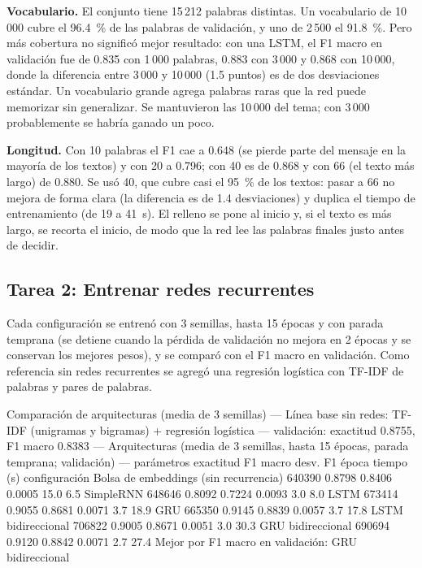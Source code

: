 \documentclass[11pt,letterpaper]{article}
\begin{document}
\textbf{Vocabulario.} El conjunto tiene 15\,212 palabras distintas. Un vocabulario de 10\,000 cubre el 96.4~\% de las palabras de validación, y uno de 2\,500 el 91.8~\%. Pero más cobertura no significó mejor resultado: con una LSTM, el F1 macro en validación fue de 0.835 con 1\,000 palabras, 0.883 con 3\,000 y 0.868 con 10\,000, donde la diferencia entre 3\,000 y 10\,000 (1.5 puntos) es de dos desviaciones estándar. Un vocabulario grande agrega palabras raras que la red puede memorizar sin generalizar. Se mantuvieron las 10\,000 del tema; con 3\,000 probablemente se habría ganado un poco.

\textbf{Longitud.} Con 10 palabras el F1 cae a 0.648 (se pierde parte del mensaje en la mayoría de los textos) y con 20 a 0.796; con 40 es de 0.868 y con 66 (el texto más largo) de 0.880. Se usó 40, que cubre casi el 95~\% de los textos: pasar a 66 no mejora de forma clara (la diferencia es de 1.4 desviaciones) y duplica el tiempo de entrenamiento (de 19 a 41~s). El relleno se pone al inicio y, si el texto es más largo, se recorta el inicio, de modo que la red lee las palabras finales justo antes de decidir.

\subsection{Tarea 2: Entrenar redes recurrentes}

Cada configuración se entrenó con 3 semillas, hasta 15 épocas y con parada temprana (se detiene cuando la pérdida de validación no mejora en 2 épocas y se conservan los mejores pesos), y se comparó con el F1 macro en validación. Como referencia sin redes recurrentes se agregó una regresión logística con TF-IDF de palabras y pares de palabras.

\begin{consola}[label=out:arq]{Comparación de arquitecturas (media de 3 semillas)}
--- Línea base sin redes: TF-IDF (unigramas y bigramas) + regresión logística ---
validación: exactitud 0.8755, F1 macro 0.8383
--- Arquitecturas (media de 3 semillas, hasta 15 épocas, parada temprana; validación) ---
                                       parámetros  exactitud  F1 macro  desv. F1  época  tiempo (s)
configuración
Bolsa de embeddings (sin recurrencia)      640390     0.8798    0.8406    0.0005   15.0         6.5
SimpleRNN                                  648646     0.8092    0.7224    0.0093    3.0         8.0
LSTM                                       673414     0.9055    0.8681    0.0071    3.7        18.9
GRU                                        665350     0.9145    0.8839    0.0057    3.7        17.8
LSTM bidireccional                         706822     0.9005    0.8671    0.0051    3.0        30.3
GRU bidireccional                          690694     0.9120    0.8842    0.0071    2.7        27.4
Mejor por F1 macro en validación: GRU bidireccional
\end{consola}
\end{document}
